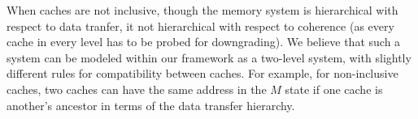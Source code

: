 When caches are not inclusive, though the memory system is hierarchical with
respect to data tranfer, it not hierarchical with respect to coherence (as
every cache in every level has to be probed for downgrading). We believe that
such a system can be modeled within our framework as a two-level system, with
slightly different rules for compatibility between caches. For example, for
non-inclusive caches, two caches can have the same address in the $M$ state if
one cache is another's ancestor in terms of the data transfer hierarchy.

%
%

